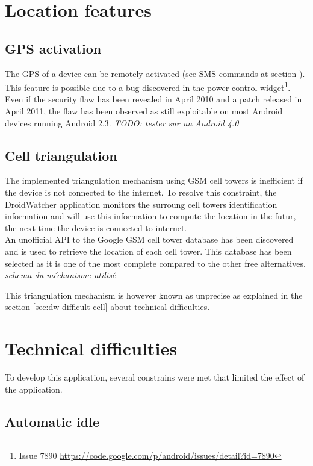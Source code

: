 \section{Location features}

\subsection{GPS activation}

The GPS of a device can be remotely activated (see SMS commands at section \label{sec:dw-smscom}).
This feature is possible due to a bug discovered in the power control widget\footnote{Issue 7890 \url{https://code.google.com/p/android/issues/detail?id=7890}}.
Even if the security flaw has been revealed in April 2010 and a patch released in April 2011, the flaw has been observed as still exploitable on most Android devices running Android 2.3.
\emph{TODO: tester sur un Android 4.0}

\subsection{Cell triangulation}
The implemented triangulation mechanism using GSM cell towers is inefficient if the device is not connected to the internet.
To resolve this constraint, the DroidWatcher application monitors the surroung cell towers identification information and will use this information to compute the location in the futur, the next time the device is connected to internet.\\

An unofficial API to the Google GSM cell tower database has been discovered and is used to retrieve the location of each cell tower.
This database has been selected as it is one of the most complete compared to the other free alternatives.\\

\emph{schema du méchanisme utilisé}

This triangulation mechanism is however known as unprecise as explained in the section \ref{sec:dw-difficult-cell} about technical difficulties.

\section{Technical difficulties}

To develop this application, several constrains were met that limited the effect of the application.

\subsection{Automatic idle}

